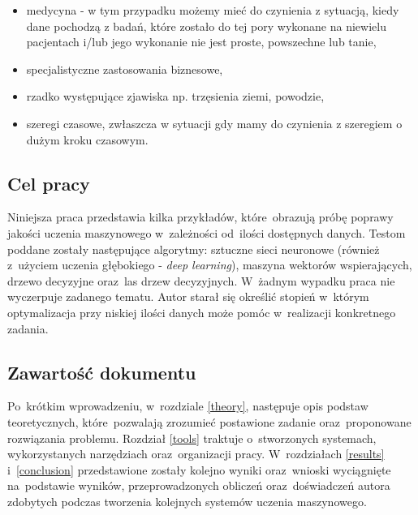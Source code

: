 \begin{itemize}
\item medycyna - w tym przypadku możemy mieć do czynienia z sytuacją, kiedy dane pochodzą z badań, które zostało do tej pory wykonane na niewielu pacjentach i/lub jego wykonanie nie jest proste, powszechne lub tanie,
\item specjalistyczne zastosowania biznesowe,
\item rzadko występujące zjawiska np. trzęsienia ziemi, powodzie,
\item szeregi czasowe,  zwłaszcza w sytuacji gdy mamy do czynienia z szeregiem o dużym kroku czasowym.
\end{itemize}

\subsection{Cel pracy}
Niniejsza praca przedstawia kilka przykładów, które~obrazują próbę poprawy jakości uczenia maszynowego w~zależności od~ilości dostępnych danych. Testom poddane  zostały następujące algorytmy: sztuczne sieci neuronowe (również z~użyciem uczenia głębokiego - \textit{deep learning}), maszyna wektorów wspierających, drzewo decyzyjne oraz~las drzew decyzyjnych. W~żadnym wypadku praca nie wyczerpuje zadanego tematu. Autor starał się określić stopień w~którym optymalizacja przy niskiej ilości danych może pomóc w~realizacji konkretnego zadania.

\subsection{Zawartość dokumentu}
Po~krótkim wprowadzeniu, w~rozdziale \ref{theory}, następuje opis podstaw teoretycznych, które~pozwalają zrozumieć postawione zadanie oraz~proponowane rozwiązania problemu. Rozdział \ref{tools} traktuje o~stworzonych systemach, wykorzystanych narzędziach oraz~organizacji pracy. W~rozdziałach \ref{results} i~\ref{conclusion} przedstawione zostały kolejno wyniki oraz~wnioski wyciągnięte na~podstawie wyników, przeprowadzonych obliczeń oraz~doświadczeń autora zdobytych podczas tworzenia kolejnych systemów uczenia maszynowego.



